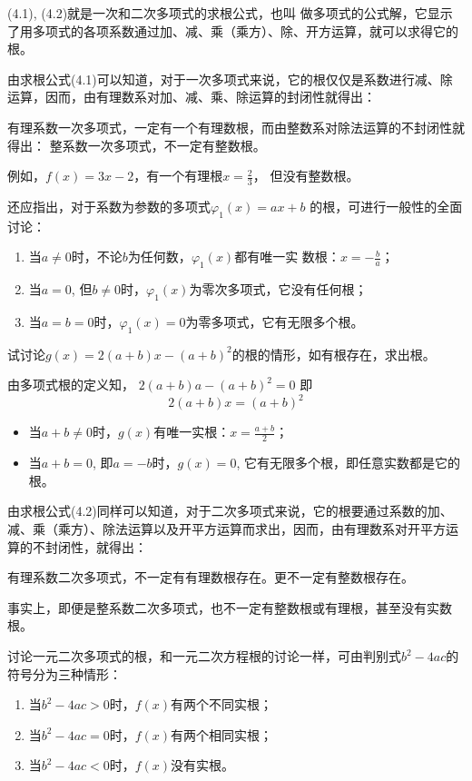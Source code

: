 (4.1), (4.2)就是一次和二次多项式的求根公式，也叫
做多项式的公式解，它显示了用多项式的各项系数通过加、减、乘（乘方）、除、开方运算，就可以求得它的根。

由求根公式(4.1)可以知道，对于一次多项式来说，它的根仅仅是系数进行减、除运算，因而，由有理数系对加、减、乘、除运算的封闭性就得出：

有理系数一次多项式，一定有一个有理数根，而由整数系对除法运算的不封闭性就得出：
整系数一次多项式，不一定有整数根。

例如，$f(x)=3x-2$，有一个有理根$x=\frac{2}{3}$，
但没有整数根。

还应指出，对于系数为参数的多项式$\varphi_1(x)=ax+b$
的根，可进行一般性的全面讨论：
\begin{enumerate}
    \item 当$a\ne 0$时，不论$b$为任何数，$\varphi_1(x)$都有唯一实
    数根：$x=-\frac{b}{a}$；
    \item 当$a=0$, 但$b\ne 0$时，$\varphi_1(x)$为零次多项式，它没有任何根；
    \item 当$a=b=0$时，$\varphi_1(x)=0$为零多项式，它有无限多个根。
\end{enumerate}

\begin{example}
    试讨论$g(x)=2(a+b)x-(a+b)^2$的根的情形，如有根存在，求出根。
\end{example}

\begin{solution}
    由多项式根的定义知，
$2 (a+b) a- (a+b)^2=0$
即
\[2 (a+b) x= (a+b)^2\]
\begin{itemize}
    \item 当$a+b\ne 0$时，$g(x)$有唯一实根：$x=\frac{a+b}{2}$；
    \item 当$a+b=0$, 即$a=-b$时，$g(x)=0$, 它有无限多个根，即任意实数都是它的根。
\end{itemize}
\end{solution}

由求根公式(4.2)同样可以知道，对于二次多项式来说，它的根要通过系数的加、减、乘（乘方）、除法运算以及开平方运算而求出，因而，由有理数系对开平方运算的不封闭性，就得出：

有理系数二次多项式，不一定有有理数根存在。更不一定有整数根存在。

事实上，即便是整系数二次多项式，也不一定有整数根或有理根，甚至没有实数根。

讨论一元二次多项式的根，和一元二次方程根的讨论一样，可由判别式$b^2-4ac$的符号分为三种情形：
\begin{enumerate}
    \item 当$b^2-4ac>0$时，$f(x)$有两个不同实根；
    \item 当$b^2-4ac=0$时，$f(x)$有两个相同实根；
    \item 当$b^2-4ac<0$时，$f(x)$没有实根。
\end{enumerate}

